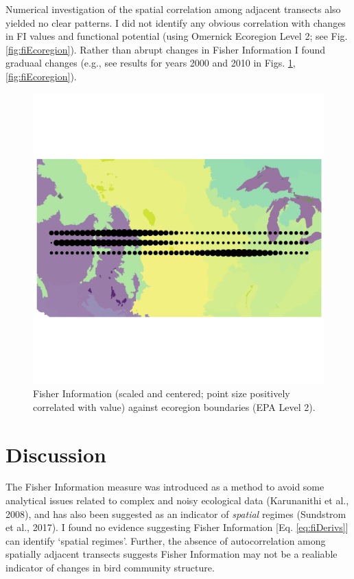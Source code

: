 \documentclass[12pt,twoside,openany]{reedthesis}
\begin{document}
Numerical investigation of the spatial correlation among adjacent transects also yielded no clear patterns. I did not identify any obvious correlation with changes in FI values and functional potential (using Omernick Ecoregion Level 2; see Fig. \ref{fig:fiEcoregion}). Rather than abrupt changes in Fisher Information I found graduaal changes (e.g., see results for years 2000 and 2010 in Figs. \ref{fig:fiEcoregion00},\ref{fig:fiEcoregion}).
\begin{figure}
\includegraphics[width=0.85\linewidth]{./chapterFiles/fisherSpatial/figures/figsCalledInDiss/scaledFiInterpolated_year2000_East-West} \caption{Fisher Information (scaled and centered; point size positively correlated with value) against ecoregion boundaries (EPA Level 2).}\label{fig:fiEcoregion00}
\end{figure}
\hypertarget{discussion-1}{%
\section{Discussion}\label{discussion-1}}

The Fisher Information measure was introduced as a method to avoid some analytical issues related to complex and noisy ecological data (Karunanithi et al., 2008), and has also been suggested as an indicator of \emph{spatial} regimes (Sundstrom et al., 2017). I found no evidence suggesting Fisher Information {[}Eq. \eqref{eq:fiDerivs}{]} can identify `spatial regimes'. Further, the absence of autocorrelation among spatially adjacent transects suggests Fisher Information may not be a realiable indicator of changes in bird community structure.
\end{document}
